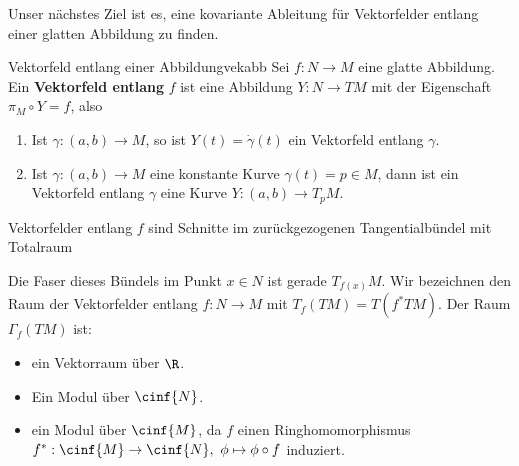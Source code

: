 Unser nächstes Ziel ist es, eine kovariante Ableitung für Vektorfelder entlang einer glatten Abbildung zu finden.
\begin{definition}{Vektorfeld entlang einer Abbildung}{vekabb}
Sei $f: N \to M$ eine glatte Abbildung. Ein \textbf{Vektorfeld entlang} $f$ ist eine Abbildung $Y: N \to TM$ mit der Eigenschaft $\pi_M \circ Y = f$, also
\begin{center}
\end{center}
\end{definition}
\begin{beispiele}
\begin{enumerate}
\item Ist $\gamma: (a,b) \to M$, so ist $Y(t) = \dot{\gamma}(t)$ ein Vektorfeld entlang $\gamma$.
\item Ist $\gamma: (a,b) \to M$ eine konstante Kurve $\gamma(t) = p \in M$, dann ist ein Vektorfeld entlang $\gamma$ eine Kurve $Y: (a,b) \to T_pM$.
\end{enumerate}
\end{beispiele}
\begin{bemerkung}
Vektorfelder entlang $f$ sind Schnitte im zurückgezogenen Tangentialbündel mit Totalraum
\begin{center}
\end{center}
Die Faser dieses Bündels im Punkt $x \in N$ ist gerade $T_{f(x)}M$.
Wir bezeichnen den Raum der Vektorfelder entlang $f: N \to M$ mit $T_f(TM)=T(f^\ast TM)$.
Der Raum $\Gamma_f (TM)$ ist:
\begin{itemize}
\item ein Vektorraum über $\R$.
\item Ein Modul über $\cinf{N}$.
\item ein Modul über $\cinf{M}$, da $f$ einen Ringhomomorphismus $f^\ast: \cinf{M} \to \cinf{N}, \ \phi \mapsto \phi \circ f$ induziert.
\end{itemize}
\end{bemerkung}
